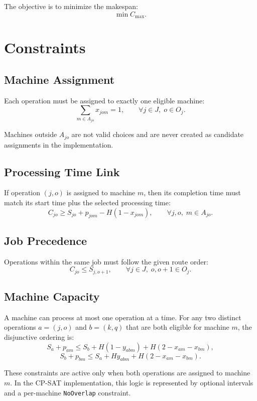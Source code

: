 ﻿\documentclass[11pt]{article}
\begin{document}
The objective is to minimize the makespan:
\[
\min C_{\max}.
\]

\section{Constraints}

\subsection{Machine Assignment}

Each operation must be assigned to exactly one eligible machine:
\[
\sum_{m \in A_{jo}} x_{jom} = 1,
\qquad \forall j \in J,\; o \in O_j.
\]

Machines outside $A_{jo}$ are not valid choices and are never created as
candidate assignments in the implementation.

\subsection{Processing Time Link}

If operation $(j,o)$ is assigned to machine $m$, then its completion time must
match its start time plus the selected processing time:
\[
C_{jo} \ge S_{jo} + p_{jom} - H(1 - x_{jom}),
\qquad \forall j,o,\; m \in A_{jo}.
\]

\subsection{Job Precedence}

Operations within the same job must follow the given route order:
\[
C_{jo} \le S_{j,o+1},
\qquad \forall j \in J,\; o,o+1 \in O_j.
\]

\subsection{Machine Capacity}

A machine can process at most one operation at a time. For any two distinct
operations $a=(j,o)$ and $b=(k,q)$ that are both eligible for machine $m$,
the disjunctive ordering is:
\[
S_a + p_{am} \le S_b + H(1 - y_{abm}) + H(2 - x_{am} - x_{bm}),
\]
\[
S_b + p_{bm} \le S_a + Hy_{abm} + H(2 - x_{am} - x_{bm}).
\]

These constraints are active only when both operations are assigned to machine
$m$. In the CP-SAT implementation, this logic is represented by optional
intervals and a per-machine \texttt{NoOverlap} constraint.
\end{document}
